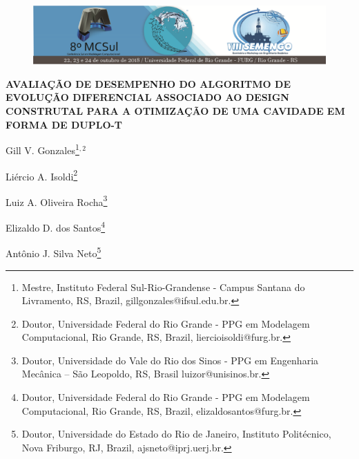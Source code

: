 \documentclass[12pt,A4,A4pt]{article}
\begin{document}

\begin{figure}
\centering
\vspace{-1cm}
\begin{minipage}[c]{\textwidth}
\centering
    \includegraphics[width=6.2in]{cabecalho.eps}
\end{minipage}
\end{figure}

\begin{center}
\fontsize{16pt}{\baselineskip}\selectfont 
\textbf{{AVALIAÇÃO DE DESEMPENHO DO ALGORITMO DE EVOLUÇÃO DIFERENCIAL ASSOCIADO AO DESIGN CONSTRUTAL PARA A OTIMIZAÇÃO DE UMA CAVIDADE EM FORMA DE DUPLO-T}}
\end{center}
\vspace{-0.9cm}

\begin{flushright}
Gill V. Gonzales\footnote{Mestre, Instituto Federal Sul-Rio-Grandense - Campus Santana do Livramento, RS, Brazil, gillgonzales@ifsul.edu.br.}$^{,2}$

Liércio A. Isoldi\footnote{Doutor, Universidade Federal do Rio Grande - PPG em Modelagem Computacional, Rio Grande, RS, Brazil, liercioisoldi@furg.br.}

Luiz A. Oliveira Rocha\footnote{Doutor, Universidade do Vale do Rio dos Sinos - PPG em Engenharia Mecânica – São Leopoldo, RS, Brasil luizor@unisinos.br.}

Elizaldo D. dos Santos\footnote{Doutor, Universidade Federal do Rio Grande - PPG em Modelagem Computacional, Rio Grande, RS, Brazil, elizaldosantos@furg.br.}

Antônio J. Silva Neto\footnote{Doutor, Universidade do Estado do Rio de Janeiro, Instituto Politécnico, Nova Friburgo, RJ, Brazil, ajsneto@iprj.uerj.br.}

\end{flushright}
\end{document}
